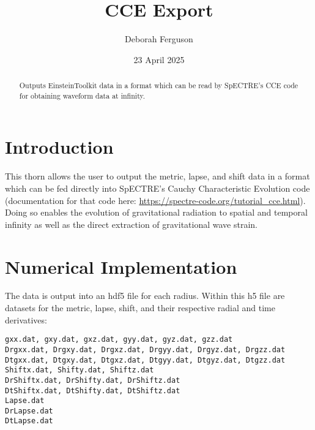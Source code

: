 \documentclass{article}
\begin{document}
\author{Deborah Ferguson}

\title{CCE Export}

\date{23 April 2025}

\maketitle



\begin{abstract}

    Outputs EinsteinToolkit data in a format which can be read by SpECTRE's CCE code for obtaining waveform data at infinity.

\end{abstract}


\section{Introduction}

This thorn allows the user to output the metric, lapse, and shift data in a format which can be fed directly into SpECTRE's
Cauchy Characteristic Evolution code (documentation for that code here: \url{https://spectre-code.org/tutorial_cce.html}).
Doing so enables the evolution of gravitational radiation to spatial and temporal infinity as well as the direct extraction
of gravitational wave strain.

\section{Numerical Implementation}

The data is output into an hdf5 file for each radius. Within this h5 file are datasets for the metric, lapse, shift, and
their respective radial and time derivatives:

\begin{verbatim}
gxx.dat, gxy.dat, gxz.dat, gyy.dat, gyz.dat, gzz.dat
Drgxx.dat, Drgxy.dat, Drgxz.dat, Drgyy.dat, Drgyz.dat, Drgzz.dat
Dtgxx.dat, Dtgxy.dat, Dtgxz.dat, Dtgyy.dat, Dtgyz.dat, Dtgzz.dat
Shiftx.dat, Shifty.dat, Shiftz.dat
DrShiftx.dat, DrShifty.dat, DrShiftz.dat
DtShiftx.dat, DtShifty.dat, DtShiftz.dat
Lapse.dat
DrLapse.dat
DtLapse.dat
\end{verbatim}
\end{document}
